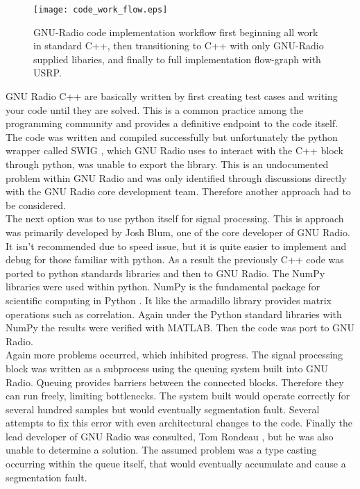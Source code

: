 \begin{figure}[!ht] 
\centering
\texttt{[image: code\_work\_flow.eps]}
\caption{GNU-Radio code implementation workflow first beginning all work in standard C++, then transitioning to C++ with only GNU-Radio supplied libaries, and finally to full implementation flow-graph with USRP.}
\end{figure}

GNU Radio C++ are basically written by first creating test cases and writing your code until they are solved.  This is a common practice among the programming community and provides a definitive endpoint to the code itself.  The code was written and compiled successfully but unfortunately the python wrapper called SWIG \cite{swig}, which GNU Radio uses to interact with the C++ block through python, was unable to export the library.  This is an undocumented problem within GNU Radio and was only identified through discussions directly with the GNU Radio core development team.  Therefore another approach had to be considered.\\

The next option was to use python itself for signal processing.  This is approach was primarily developed by Josh Blum, one of the core developer of GNU Radio.  It isn't recommended due to speed issue, but it is quite easier to implement and debug for those familiar with python.  As a result the previously C++ code was ported to python standards libraries and then to GNU Radio.  The NumPy libraries were used within python.  NumPy is the fundamental package for scientific computing in Python \cite{numpy}.  It like the armadillo library provides matrix operations such as correlation.  Again under the Python standard libraries with NumPy the results were verified with MATLAB.  Then the code was port to GNU Radio.\\

Again more problems occurred, which inhibited progress.  The signal processing block was written as a subprocess using the queuing system built into GNU Radio.  Queuing provides barriers between the connected blocks.  Therefore they can run freely, limiting bottlenecks. The system built would operate correctly for several hundred samples but would eventually segmentation fault.  Several attempts to fix this error with even architectural changes to the code.  Finally the lead developer of GNU Radio was consulted, Tom Rondeau \cite{tomrondeau}, but he was also unable to determine a solution.  The assumed problem was a type casting occurring within the queue itself, that would eventually accumulate and cause a segmentation fault.\\

